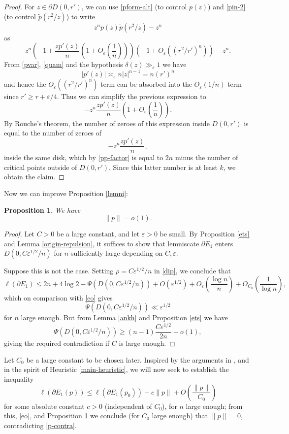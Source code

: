\documentclass[12pt]{amsart}
\newtheorem{proposition}[theorem]{Proposition}
\newcommand{\eps}{\varepsilon}
\begin{document}
\begin{proof}
For $z \in \partial D(0,r')$, we can use \eqref{pform-alt} (to control $p(z)$) and \eqref{pin-2} (to control $\tilde p(r^2/z)$) to write
$$ z^n p(z) \tilde p(r^2/z) - z^n$$
as
$$ z^n \left( -1 + \frac{zp'(z)}{n} \left( 1 + O_\eps\left(\frac{1}{n} \right) \right) \right)
\left( -1 + O_\eps( (r^2/r')^n ) \right) - z^n.$$
From \eqref{pvar}, \eqref{quam} and the hypothesis $\delta(z) \gg_\eps 1$ we have
$$ |p'(z)| \asymp_\eps n |z|^{n-1} = n (r')^n$$
and hence the $O_\eps( (r^2/r')^n )$ term can be absorbed into the $O_\eps(1/n)$ term since $r' \geq r + \eps/4$.  Thus we can simplify the previous expression to
$$ - z^n \frac{zp'(z)}{n} \left( 1 + O_\eps\left(\frac{1}{n} \right) \right).$$
By Rouche's theorem, the number of zeroes of this expression inside $D(0,r')$ is equal to the number of zeroes of
$$ - z^n \frac{zp'(z)}{n},$$
inside the same disk, which by \eqref{pp-factor} is equal to $2n$ minus the number of critical points outside of $D(0,r')$.  Since this latter number is at least $k$, we obtain the claim.
\end{proof}

Now we can improve Proposition \ref{lemni}:

\begin{proposition}\label{pots}  We have
    $$ \|p\| = o(1).$$
\end{proposition}

\begin{proof}
 Let $C>0$ be a large constant, and let $\eps>0$ be small.   By Proposition \ref{ets} and Lemma \ref{origin-repulsion}, it suffices to show that lemniscate $\partial E_1$ enters $D(0,C \eps^{1/2}/n)$ for $n$ sufficiently large depending on $C,\eps$.

Suppose this is not the case.  Setting $\rho = C\eps^{1/2}/n$ in \eqref{dip}, we conclude that
$$ \ell(\partial E_1) \leq 2n + 4 \log 2 - \Psi(D(0,C\eps^{1/2}/n)) + O(\eps^{1/2}) + O_\eps\left(\frac{\log n}{n} \right) + O_{C_0}\left( \frac{1}{\log n} \right),$$
which on comparison with \eqref{eo} gives
$$ \Psi(D(0,C\eps^{1/2}/n)) \ll \eps^{1/2}$$
for $n$ large enough.  But from Lemma \ref{ankh} and Proposition \ref{ets} we have
$$ \Psi(D(0,C\eps^{1/2}/n)) \geq (n-1) \frac{C\eps^{1/2}}{2n} - o(1),$$
giving the required contradiction if $C$ is large enough.
\end{proof}

Let $C_0$ be a large constant to be chosen later. Inspired by the arguments in \cite[\S 6]{fryntov}, and in the spirit of Heuristic \ref{main-heuristic}, we will now seek to establish the inequality
\begin{equation}\label{a-ineq}
    \ell( \partial E_1(p) ) \leq \ell( \partial E_1(p_0) ) - c \|p\| + O\left(\frac{\|p\|}{C_0}\right)
\end{equation}
for some absolute constant $c>0$ (independent of $C_0$), for $n$ large enough; from this, \eqref{eo}, and Proposition \ref{pots} we conclude (for $C_0$ large enough) that $\|p\|=0$, contradicting \eqref{p-contra}.
\end{document}
